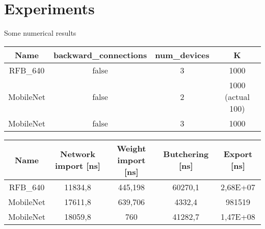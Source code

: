 \section{Experiments}

\begin{frame}[plain]{}
    \sectionpage
\end{frame}

\begin{frame}{Some numerical results}

\begin{table}[]
\begin{tabular}{|c|c|c|c|}
\hline
\textbf{Name}      & \textbf{backward\_connections} & \textbf{num\_devices} & \textbf{K}        \\ \hline
RFB\_640  & false                          & 3                     & 1000              \\ \hline
MobileNet & false                          & 2                     & 1000 (actual 100) \\ \hline
MobileNet & false                          & 3                     & 1000              \\ \hline
\end{tabular}
\end{table}

\begin{table}[]
\begin{tabular}{|c|c|c|c|c|}
\hline
\textbf{Name} & \textbf{Network import {[}ns{]}} & \textbf{Weight import {[}ns{]}} & \textbf{Butchering {[}ns{]}} & \textbf{Export {[}ns{]}} \\ \hline
RFB\_640 & 11834,8 & 445,198 & 60270,1 & 2,68E+07 \\ \hline
MobileNet          & 17611,8 & 639,706 & 4332,4  & 981519   \\ \hline
MobileNet          & 18059,8 & 760     & 41282,7 & 1,47E+08 \\ \hline
\end{tabular}
\end{table}

\end{frame}